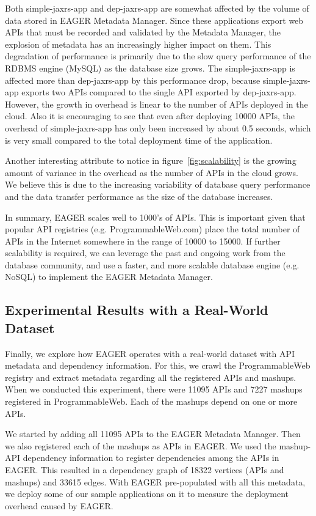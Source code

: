 Both simple-jaxrs-app and dep-jaxrs-app are
somewhat affected by the volume of data stored in EAGER Metadata Manager. Since these applications export web APIs that must be 
recorded and validated by the Metadata Manager, the explosion of metadata has an increasingly higher impact on them. This degradation 
of performance is primarily due to the slow query performance of the RDBMS engine (MySQL) as the database size grows. The simple-jaxrs-app
is affected more than dep-jaxrs-app by this performance drop, because simple-jaxrs-app exports two APIs compared to the single API exported 
by dep-jaxrs-app. However, the growth
in overhead is linear to the number of APIs deployed in the cloud. Also it is encouraging to see that
even after deploying 10000 APIs, the overhead of simple-jaxrs-app has only been increased by about 0.5 seconds, which is very small compared
to the total deployment time of the application.

Another interesting attribute to notice in figure~\ref{fig:scalability} is the growing amount of variance in the overhead as the number of APIs in the cloud grows.
We believe this is due to the increasing variability of database query performance and the data transfer performance as the size of the 
database increases.

In summary, EAGER scales well to 1000's of APIs. This is important given that popular API registries (e.g. ProgrammableWeb.com) 
place the total number of APIs in the Internet somewhere in the range of 10000 to 15000. If further scalability is required, we can leverage the past and ongoing
work from the database community, and use a faster, and more scalable database engine (e.g. NoSQL) to implement the
EAGER Metadata Manager.

\subsection{Experimental Results with a Real-World Dataset}
Finally, we explore how EAGER operates with a real-world dataset with API metadata and dependency information. For this, we 
crawl the ProgrammableWeb registry and extract metadata regarding all the registered APIs and mashups. When we conducted
this experiment, there were 11095 APIs and 7227 mashups registered in ProgrammableWeb. Each of the mashups depend on one or more APIs.

We started by adding all 11095 APIs to the EAGER Metadata Manager. Then we also registered each of the mashups as APIs in EAGER. We used the
mashup-API dependency information to register dependencies among the APIs in EAGER. This resulted in a 
dependency graph of 18322 vertices (APIs and mashups) and 33615 edges. With EAGER pre-populated with all this metadata, we deploy
some of our sample applications on it to measure the deployment overhead caused by EAGER.

